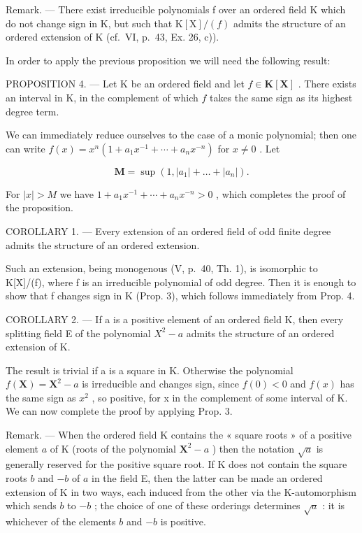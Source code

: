 Remark. --- There exist irreducible polynomials f over an ordered field K which do not change sign in K, but such that \(\mathrm{K}[\mathrm{X}]/(f)\) admits the structure of an ordered extension of K (cf.~VI, p.~43, Ex. 26, c)).

In order to apply the previous proposition we will need the following result:

PROPOSITION 4. --- Let K be an ordered field and let \(f \in \mathbf{K}[\mathbf{X}]\) . There exists an interval in K, in the complement of which \(f\) takes the same sign as its highest degree term.

We can immediately reduce ourselves to the case of a monic polynomial; then one can write \(f(x) = x^{n}(1 + a_{1}x^{-1} + \cdots + a_{n}x^{-n})\) for \(x \neq 0\) . Let

\[
\mathbf {M} = \sup \left(1, | a _ {1} | + \dots + | a _ {n} |\right).
\]

For \(|x| > M\) we have \(1 + a_{1}x^{-1} + \cdots + a_{n}x^{-n} > 0\) , which completes the proof of the proposition.

COROLLARY 1. --- Every extension of an ordered field of odd finite degree admits the structure of an ordered extension.

Such an extension, being monogenous (V, p.~40, Th. 1), is isomorphic to K{[}X{]}/(f), where f is an irreducible polynomial of odd degree. Then it is enough to show that f changes sign in K (Prop. 3), which follows immediately from Prop. 4.

COROLLARY 2. --- If a is a positive element of an ordered field K, then every splitting field E of the polynomial \(X^{2}-a\) admits the structure of an ordered extension of K.

The result is trivial if a is a square in K. Otherwise the polynomial \(f(\mathbf{X}) = \mathbf{X}^{2} - a\) is irreducible and changes sign, since \(f(0) < 0\) and \(f(x)\) has the same sign as \(x^{2}\) , so positive, for x in the complement of some interval of K. We can now complete the proof by applying Prop. 3.

Remark. --- When the ordered field K contains the « square roots » of a positive element \(a\) of K (roots of the polynomial \(\mathbf{X}^2 - a\) ) then the notation \(\sqrt{a}\) is generally reserved for the positive square root. If K does not contain the square roots \(b\) and \(-b\) of \(a\) in the field E, then the latter can be made an ordered extension of K in two ways, each induced from the other via the K-automorphism which sends \(b\) to \(-b\) ; the choice of one of these orderings determines \(\sqrt{a}\) : it is whichever of the elements \(b\) and \(-b\) is positive.

